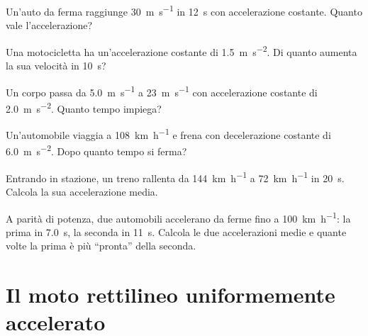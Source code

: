 \begin{esercizio}
Un'auto da ferma raggiunge \SI{30}{\metre\per\second} in \SI{12}{\second} con accelerazione costante. Quanto vale l'accelerazione?\\
\end{esercizio}

\begin{esercizio}
Una motocicletta ha un'accelerazione costante di \SI{1,5}{\metre\per\second\squared}. Di quanto aumenta la sua velocità in \SI{10}{\second}?\\
\end{esercizio}

\begin{esercizio}
Un corpo passa da \SI{5,0}{\metre\per\second} a \SI{23}{\metre\per\second} con accelerazione costante di \SI{2,0}{\metre\per\second\squared}. Quanto tempo impiega?\\
\end{esercizio}

\begin{esercizio}
Un'automobile viaggia a \SI{108}{\kilo\metre\per\hour} e frena con decelerazione costante di \SI{6,0}{\metre\per\second\squared}. Dopo quanto tempo si ferma?\\
\end{esercizio}

\begin{esercizio}
Entrando in stazione, un treno rallenta da \SI{144}{\kilo\metre\per\hour} a \SI{72}{\kilo\metre\per\hour} in \SI{20}{\second}. Calcola la sua accelerazione media.\\
\end{esercizio}

\begin{esercizio}
A parità di potenza, due automobili accelerano da ferme fino a \SI{100}{\kilo\metre\per\hour}: la prima in \SI{7,0}{\second}, la seconda in \SI{11}{\second}. Calcola le due accelerazioni medie e quante volte la prima è più ``pronta'' della seconda.\\
\end{esercizio}

\section{Il moto rettilineo uniformemente accelerato}

